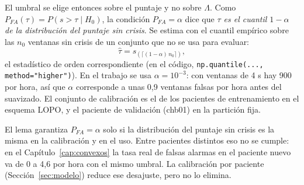 El umbral se elige entonces sobre el puntaje y no sobre $\Lambda$. Como $P_{FA}(\tau) = P(s > \tau \mid H_0)$, la
condición $P_{FA} = \alpha$ dice que \emph{$\tau$ es el cuantil $1 - \alpha$ de la distribución del puntaje sin crisis}.
Se estima con el cuantil empírico sobre las $n_0$ ventanas sin crisis de un conjunto que no se usa para evaluar:
\begin{equation}
  \hat\tau = s_{(\lceil(1-\alpha)\,n_0\rceil)},
  \label{eq:umbral_np}
\end{equation}
el estadístico de orden correspondiente (en el código, \texttt{np.quantile(..., method="higher")}). En el trabajo
se usa $\alpha = 10^{-3}$: con ventanas de 4 s hay 900 por hora, así que $\alpha$ corresponde a unas 0,9
ventanas falsas por hora antes del suavizado. El conjunto de calibración es el de los pacientes de entrenamiento
en el esquema LOPO, y el paciente de validación (chb01) en la partición fija.

\begin{observacion}
\label{obs:np_supuesto}
El lema garantiza $P_{FA} = \alpha$ solo si la distribución del puntaje sin crisis es la misma en la calibración y
en el uso. Entre pacientes distintos eso no se cumple: en el Capítulo~\ref{cap:convexos} la tasa real de falsas alarmas
en el paciente nuevo va de 0 a 4,6 por hora con el mismo umbral. La calibración por paciente
(Sección~\ref{sec:modelo}) reduce ese desajuste, pero no lo elimina.
\end{observacion}
